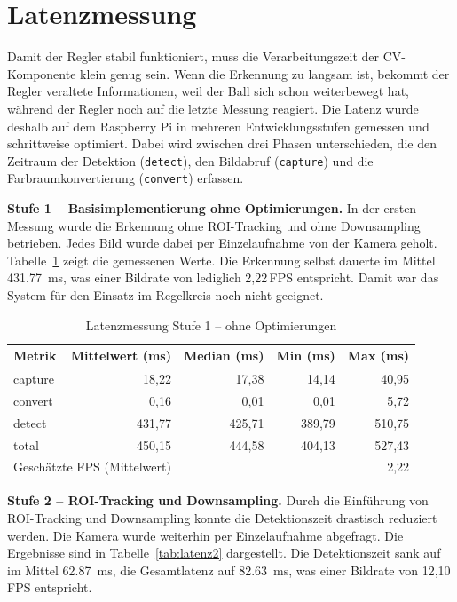 \documentclass[11pt, a4paper]{scrreprt}
\begin{document}
\section{Latenzmessung}

Damit der Regler stabil funktioniert, muss die Verarbeitungszeit der
CV-Komponente klein genug sein. Wenn die Erkennung zu langsam ist,
bekommt der Regler veraltete Informationen, weil der Ball sich schon
weiterbewegt hat, während der Regler noch auf die letzte Messung reagiert.
Die Latenz wurde deshalb auf dem Raspberry Pi in mehreren Entwicklungsstufen
gemessen und schrittweise optimiert. Dabei wird zwischen drei Phasen
unterschieden, die den Zeitraum der Detektion (\texttt{detect}),
den Bildabruf (\texttt{capture}) und die Farbraumkonvertierung
(\texttt{convert}) erfassen.

\textbf{Stufe 1 – Basisimplementierung ohne Optimierungen.}
In der ersten Messung wurde die Erkennung ohne ROI-Tracking und ohne
Downsampling betrieben. Jedes Bild wurde dabei per Einzelaufnahme von
der Kamera geholt. Tabelle~\ref{tab:latenz1} zeigt die gemessenen Werte.
Die Erkennung selbst dauerte im Mittel \SI{431,77}{\milli\second}, was
einer Bildrate von lediglich 2,22\,FPS entspricht. Damit war das System
für den Einsatz im Regelkreis noch nicht geeignet.

\begin{table}[h]
\centering
\caption{Latenzmessung Stufe 1 – ohne Optimierungen}
\label{tab:latenz1}
\begin{tabular}{lrrrr}
  \toprule
  Metrik & Mittelwert (ms) & Median (ms) & Min (ms) & Max (ms) \\
  \midrule
  capture & 18{,}22 & 17{,}38 & 14{,}14 & 40{,}95 \\
  convert & 0{,}16  & 0{,}01  & 0{,}01  & 5{,}72  \\
  detect  & 431{,}77 & 425{,}71 & 389{,}79 & 510{,}75 \\
  total   & 450{,}15 & 444{,}58 & 404{,}13 & 527{,}43 \\
  \midrule
  \multicolumn{2}{l}{Geschätzte FPS (Mittelwert)} & \multicolumn{3}{r}{2{,}22} \\
  \bottomrule
\end{tabular}
\end{table}

\textbf{Stufe 2 – ROI-Tracking und Downsampling.}
Durch die Einführung von ROI-Tracking und Downsampling konnte die
Detektionszeit drastisch reduziert werden. Die Kamera wurde weiterhin
per Einzelaufnahme abgefragt. Die Ergebnisse sind in
Tabelle~\ref{tab:latenz2} dargestellt. Die Detektionszeit sank auf
im Mittel \SI{62,87}{\milli\second}, die Gesamtlatenz auf
\SI{82,63}{\milli\second}, was einer Bildrate von 12,10\,FPS entspricht.
\end{document}
